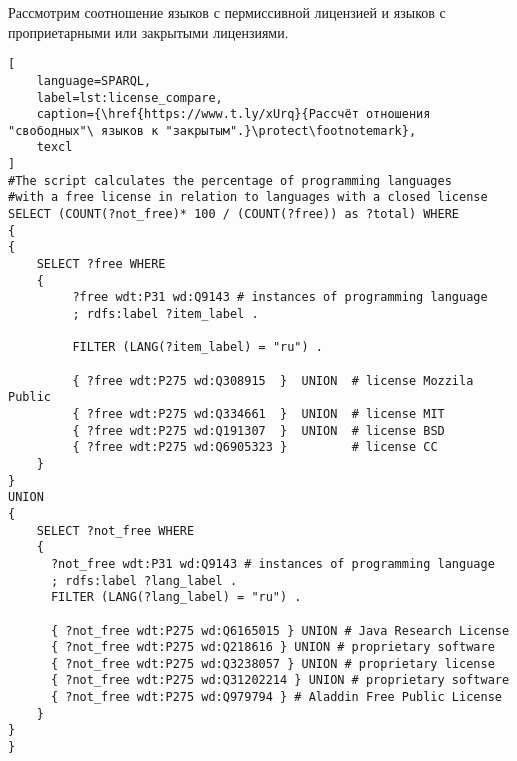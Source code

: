 Рассмотрим соотношение языков с пермиссивной лицензией и языков с проприетарными или закрытыми лицензиями.

\label{question:prog_lang_2}
\begin{lstlisting}[
	language=SPARQL,
	label=lst:license_compare,
	caption={\href{https://www.t.ly/xUrq}{Рассчёт отношения "свободных"\ языков к "закрытым".}\protect\footnotemark},
	texcl
]
#The script calculates the percentage of programming languages 
#with a free license in relation to languages with a closed license
SELECT (COUNT(?not_free)* 100 / (COUNT(?free)) as ?total) WHERE
{ 
{
    SELECT ?free WHERE 
    {
         ?free wdt:P31 wd:Q9143 # instances of programming language
         ; rdfs:label ?item_label . 

         FILTER (LANG(?item_label) = "ru") . 
  
         { ?free wdt:P275 wd:Q308915  }  UNION  # license Mozzila Public
         { ?free wdt:P275 wd:Q334661  }  UNION  # license MIT
         { ?free wdt:P275 wd:Q191307  }  UNION  # license BSD
         { ?free wdt:P275 wd:Q6905323 }         # license CC
    }
}
UNION
{
    SELECT ?not_free WHERE 
    {
      ?not_free wdt:P31 wd:Q9143 # instances of programming language
      ; rdfs:label ?lang_label . 
      FILTER (LANG(?lang_label) = "ru") .
  
      { ?not_free wdt:P275 wd:Q6165015 } UNION # Java Research License
      { ?not_free wdt:P275 wd:Q218616 } UNION # proprietary software
      { ?not_free wdt:P275 wd:Q3238057 } UNION # proprietary license 
      { ?not_free wdt:P275 wd:Q31202214 } UNION # proprietary software 
      { ?not_free wdt:P275 wd:Q979794 } # Aladdin Free Public License
    }
}
}
\end{lstlisting}

